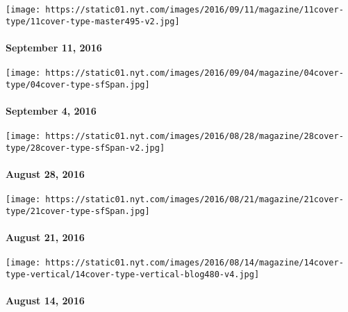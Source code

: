 \href{http://www.nytimes.com/indexes/2016/09/11/magazine/index.html}{}

\texttt{[image: https://static01.nyt.com/images/2016/09/11/magazine/11cover-type/11cover-type-master495-v2.jpg]}

\hypertarget{september-11-2016}{%
\paragraph{September 11, 2016}\label{september-11-2016}}

\href{http://www.nytimes.com/indexes/2016/09/04/magazine/index.html}{}

\texttt{[image: https://static01.nyt.com/images/2016/09/04/magazine/04cover-type/04cover-type-sfSpan.jpg]}

\hypertarget{september-4-2016}{%
\paragraph{September 4, 2016}\label{september-4-2016}}

\href{http://www.nytimes.com/indexes/2016/08/28/magazine/index.html}{}

\texttt{[image: https://static01.nyt.com/images/2016/08/28/magazine/28cover-type/28cover-type-sfSpan-v2.jpg]}

\hypertarget{august-28-2016}{%
\paragraph{August 28, 2016}\label{august-28-2016}}

\href{http://www.nytimes.com/indexes/2016/08/21/magazine/index.html}{}

\texttt{[image: https://static01.nyt.com/images/2016/08/21/magazine/21cover-type/21cover-type-sfSpan.jpg]}

\hypertarget{august-21-2016}{%
\paragraph{August 21, 2016}\label{august-21-2016}}

\href{http://www.nytimes.com/indexes/2016/08/14/magazine/index.html}{}

\texttt{[image: https://static01.nyt.com/images/2016/08/14/magazine/14cover-type-vertical/14cover-type-vertical-blog480-v4.jpg]}

\hypertarget{august-14-2016}{%
\paragraph{August 14, 2016}\label{august-14-2016}}


